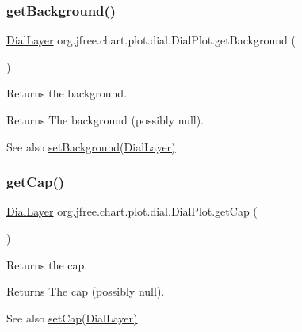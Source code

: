 \subsubsection{\texorpdfstring{get\+Background()}{getBackground()}}
{\footnotesize\ttfamily \mbox{\hyperlink{interfaceorg_1_1jfree_1_1chart_1_1plot_1_1dial_1_1_dial_layer}{Dial\+Layer}} org.\+jfree.\+chart.\+plot.\+dial.\+Dial\+Plot.\+get\+Background (\begin{DoxyParamCaption}{ }\end{DoxyParamCaption})}

Returns the background.

\begin{DoxyReturn}{Returns}
The background (possibly {\ttfamily null}).
\end{DoxyReturn}
\begin{DoxySeeAlso}{See also}
\mbox{\hyperlink{classorg_1_1jfree_1_1chart_1_1plot_1_1dial_1_1_dial_plot_a0b16b2d5119b933d96683c5737fca45d}{set\+Background(\+Dial\+Layer)}} 
\end{DoxySeeAlso}
\mbox{\label{classorg_1_1jfree_1_1chart_1_1plot_1_1dial_1_1_dial_plot_a4bfa1709db2fe99136ddcf2ee890c0ef}} 
\subsubsection{\texorpdfstring{get\+Cap()}{getCap()}}
{\footnotesize\ttfamily \mbox{\hyperlink{interfaceorg_1_1jfree_1_1chart_1_1plot_1_1dial_1_1_dial_layer}{Dial\+Layer}} org.\+jfree.\+chart.\+plot.\+dial.\+Dial\+Plot.\+get\+Cap (\begin{DoxyParamCaption}{ }\end{DoxyParamCaption})}

Returns the cap.

\begin{DoxyReturn}{Returns}
The cap (possibly {\ttfamily null}).
\end{DoxyReturn}
\begin{DoxySeeAlso}{See also}
\mbox{\hyperlink{classorg_1_1jfree_1_1chart_1_1plot_1_1dial_1_1_dial_plot_a895fa9fbd692fdac0884f21e809871a5}{set\+Cap(\+Dial\+Layer)}} 
\end{DoxySeeAlso}
\mbox{\label{classorg_1_1jfree_1_1chart_1_1plot_1_1dial_1_1_dial_plot_aad16922aa6f58ad35ea660ddc42f45fd}} 
